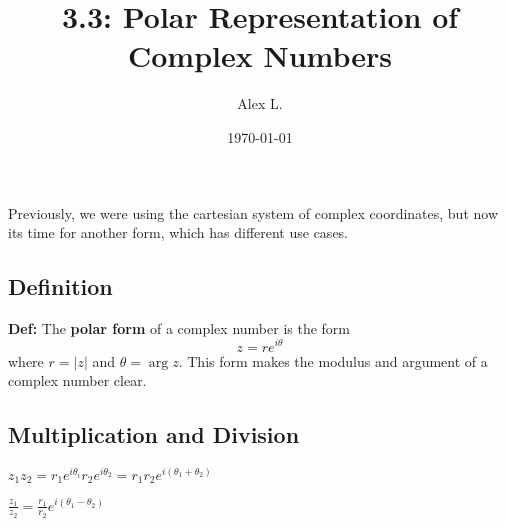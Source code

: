 \documentclass{article}
\title{3.3: Polar Representation of Complex Numbers}
\author{Alex L.}
\date{\today}
\begin{document}
\maketitle

Previously, we were using the cartesian system of complex coordinates, but now its time for another form, which has different use cases.

\subsection{Definition}

\textbf{Def:} The \textbf{polar form} of a complex number is the form $$z = re^{i\theta}$$where $r = \vert z\vert$ and $\theta = \arg z$. This form makes the modulus and argument of a complex number clear.

\subsection{Multiplication and Division}

$z_1 z_2 = r_1e^{i\theta_i}r_2e^{i\theta_2} = r_1r_2 e^{i(\theta_1 + \theta_2)}$

$\frac{z_1}{z_2} = \frac{r_1}{r_2}e^{i(\theta_1 - \theta_2)}$
\end{document}
